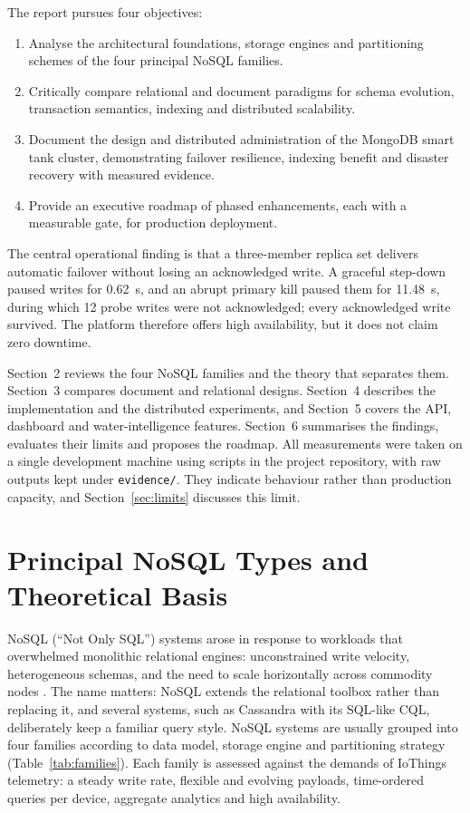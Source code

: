 \documentclass[11pt,a4paper]{article}
\begin{document}
The report pursues four objectives:
\begin{enumerate}[noitemsep]
\item Analyse the architectural foundations, storage engines and partitioning schemes of the four principal NoSQL families.
\item Critically compare relational and document paradigms for schema evolution, transaction semantics, indexing and distributed scalability.
\item Document the design and distributed administration of the MongoDB smart tank cluster, demonstrating failover resilience, indexing benefit and disaster recovery with measured evidence.
\item Provide an executive roadmap of phased enhancements, each with a measurable gate, for production deployment.
\end{enumerate}

The central operational finding is that a three-member replica set delivers automatic failover without losing an acknowledged write. A graceful step-down paused writes for 0.62~s, and an abrupt primary kill paused them for 11.48~s, during which 12 probe writes were not acknowledged; every acknowledged write survived. The platform therefore offers high availability, but it does not claim zero downtime.

Section~2 reviews the four NoSQL families and the theory that separates them. Section~3 compares document and relational designs. Section~4 describes the implementation and the distributed experiments, and Section~5 covers the API, dashboard and water-intelligence features. Section~6 summarises the findings, evaluates their limits and proposes the roadmap. All measurements were taken on a single development machine using scripts in the project repository, with raw outputs kept under \texttt{evidence/}. They indicate behaviour rather than production capacity, and Section~\ref{sec:limits} discusses this limit.

\section{Principal NoSQL Types and Theoretical Basis}

NoSQL (``Not Only SQL'') systems arose in response to workloads that overwhelmed monolithic relational engines: unconstrained write velocity, heterogeneous schemas, and the need to scale horizontally across commodity nodes \citep{cattell2011,sadalage2012}. The name matters: NoSQL extends the relational toolbox rather than replacing it, and several systems, such as Cassandra with its SQL-like CQL, deliberately keep a familiar query style. NoSQL systems are usually grouped into four families according to data model, storage engine and partitioning strategy (Table~\ref{tab:families}). Each family is assessed against the demands of IoThings telemetry: a steady write rate, flexible and evolving payloads, time-ordered queries per device, aggregate analytics and high availability.
\end{document}
